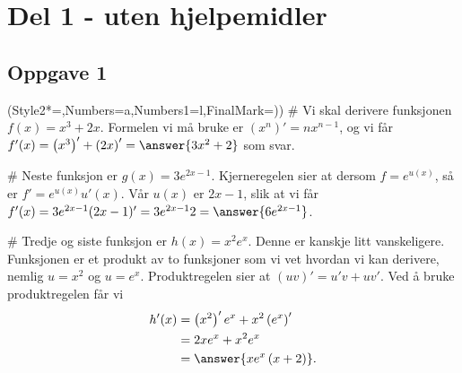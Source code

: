 


\newcommand{\fagkode}{S2}
\newcommand{\semesteraar}{høsten 2015}
\newcommand{\forfatter}{Tommy O.}
\newcommand{\dokumenttittel}{Løsningsforslag -- Eksamen \fagkode, \semesteraar}


\newcommand{\logonavn}{figs/metis_akademiet_privatistskole_doclogo.png}




\section*{Del 1 - uten hjelpemidler}
\subsection*{Oppgave 1}
\begin{easylist}[enumerate]
	\ListProperties(Style2*=,Numbers=a,Numbers1=l,FinalMark={)})
	# Vi skal derivere funksjonen $f(x) = x^3 + 2x$.
	Formelen vi må bruke er $(x^n)' = nx^{n-1}$, og vi får $f'(x) = \left(x^3\right)' + \left(2x\right)' = \answer{3x^2 + 2}$ som svar.

	# Neste funksjon er $g(x) = 3e^{2x-1}$.
	Kjerneregelen sier at dersom $f = e^{u(x)}$, så er $f' = e^{u(x)} u'(x)$.
	Vår $u(x)$ er $ 2x-1$, slik at vi får $f'(x) = 3e^{2x-1} (2x-1)' = 3e^{2x-1} 2 = \answer{6e^{2x-1}}$.
	
	# Tredje og siste funksjon er $h(x) = x^2e^x$.
	Denne er kanskje litt vanskeligere. Funksjonen er et produkt av to funksjoner som vi vet hvordan vi  kan derivere, nemlig $u = x^2$ og $u = e^x$.
	Produktregelen sier at $(uv)' = u'v + uv'$. Ved å bruke produktregelen får vi
	\begin{align*}
		h'(x) &= \left(x^2\right)'  e^x + x^2\left(e^x\right)' \\
			&= 2x  e^x + x^2e^x \\
			&= \answer{xe^x\left(x+2\right)}.
	\end{align*}
\end{easylist}

